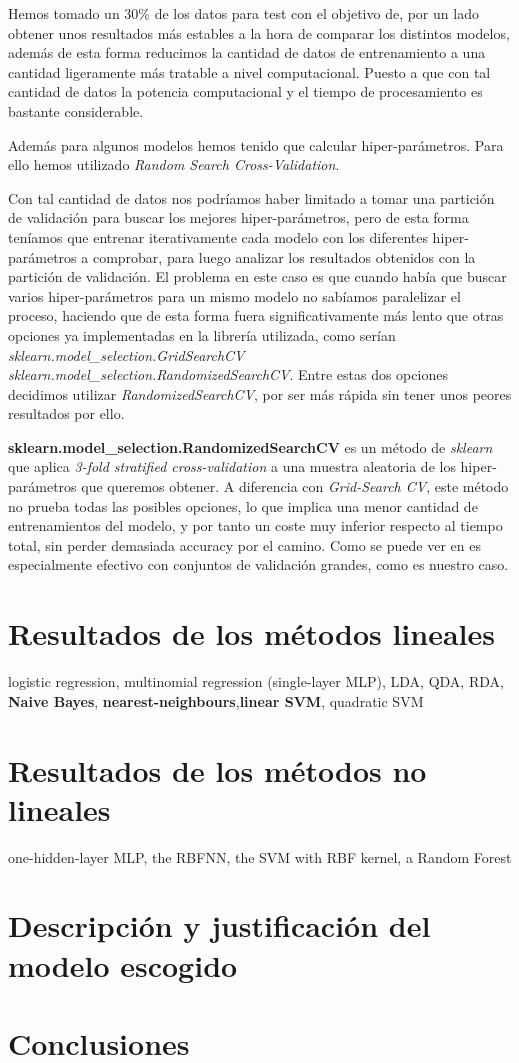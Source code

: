 \documentclass[a4paper]{article}
\begin{document}
Hemos tomado un 30\% de los datos para test con el objetivo de, por un lado obtener unos resultados más estables a la hora de 
comparar los distintos modelos, además de esta forma reducimos la cantidad de datos de entrenamiento a una cantidad ligeramente 
más tratable a nivel computacional. Puesto a que con tal cantidad de datos la potencia computacional y el tiempo de procesamiento es 
bastante considerable. 

Además para algunos modelos hemos tenido que calcular hiper-parámetros. Para ello hemos utilizado \textit{Random Search Cross-Validation}.

Con tal cantidad de datos nos podríamos haber limitado a tomar una partición de validación para buscar los mejores hiper-parámetros, pero de 
esta forma teníamos que entrenar iterativamente cada modelo con los diferentes hiper-parámetros a comprobar, para luego analizar los resultados obtenidos con la partición de validación. El problema en este caso es que cuando había que buscar varios hiper-parámetros para un mismo modelo no sabíamos paralelizar el proceso, haciendo que de esta forma fuera significativamente más lento que otras opciones ya implementadas en la librería utilizada, como serían \textit{sklearn.model\_selection.GridSearchCV} \textit{sklearn.model\_selection.RandomizedSearchCV}. Entre estas dos opciones decidimos utilizar \textit{RandomizedSearchCV}, por ser más rápida sin tener unos peores resultados por ello. 

\textbf{sklearn.model\_selection.RandomizedSearchCV} es un método de \textit{sklearn} que aplica \textit{3-fold stratified cross-validation} a una muestra aleatoria de los hiper-parámetros que queremos obtener. A diferencia con \textit{Grid-Search CV}, este método no prueba todas las posibles opciones, lo que implica una menor cantidad de entrenamientos del modelo, y por tanto un coste muy inferior respecto al tiempo  total, sin perder demasiada accuracy por el camino. Como se puede ver en \citep{randomSearch} es especialmente efectivo con conjuntos de validación grandes, como es nuestro caso. 

\section{Resultados de los métodos lineales}
logistic regression, multinomial regression
(single-layer MLP), LDA, QDA, RDA, \textbf{Naive Bayes}, \textbf{nearest-neighbours},\textbf{linear SVM}, quadratic SVM
\section{Resultados de los métodos no lineales}
one-hidden-layer MLP, the RBFNN, the SVM with RBF kernel, a
Random Forest
\section{Descripción y justificación del modelo escogido}

\section{Conclusiones}



\end{document}
